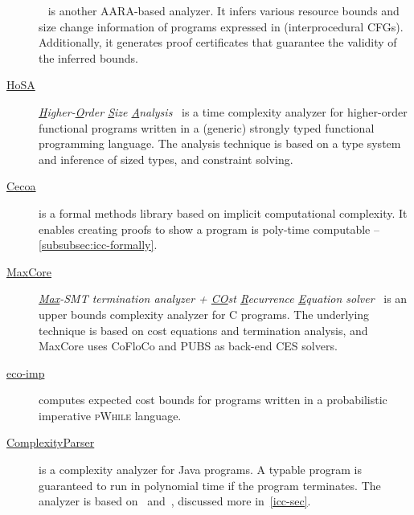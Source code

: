 \begin{description}
\item[\href{https://github.com/academic-archive/cav17-pastis}{}]
      ~\cite{carbonneaux2017,carbonneaux2018}
      is another AARA-based analyzer. It infers various resource bounds and size
      change information of programs expressed in  (interprocedural
      CFGs). Additionally, it generates proof certificates that guarantee the
      validity of the inferred bounds.

\item[\href{http://cl-informatik.uibk.ac.at/users/zini/software/hosa/}{HoSA}]
      \emph{\underline{H}igher-\underline{O}rder \underline{S}ize
      \underline{A}nalysis}~\cite{avanzini2017}
      is a time complexity analyzer for higher-order functional programs written
      in a (generic) strongly typed functional programming language. The
      analysis technique is based on a type system and inference of sized types,
      and constraint solving.

\item[\href{https://github.com/davidnowak/cecoa}
     {Cecoa}]\cite{feree2018}
     is a formal methods library based on implicit computational complexity.
     It enables creating proofs to show a program is poly-time
     computable -- \autoref{subsubsec:icc-formally}.

\item[\href{https://costa.fdi.ucm.es/maxcore/}{MaxCore}]%
      \emph{\underline{Max}-SMT termination analyzer + \underline{CO}st
      \underline{R}ecurrence \underline{E}quation
      solver}~\cite{albert2019} is an upper bounds complexity
      analyzer for C programs. The underlying technique is based on
      cost equations and termination analysis, and MaxCore uses CoFloCo and PUBS
      as back-end CES solvers.

\item[\href{https://www-sop.inria.fr/members/Martin.Avanzini/software/eco-imp/}
      {eco-imp}]\cite{avanzini2020}
      computes expected cost bounds for programs written in a probabilistic
      imperative \textsc{pWhile} language.

\item[\href{https://gitlab.inria.fr/complexityparser/complexityparser}
      {ComplexityParser}]\cite{hainry2021}
      is a complexity analyzer for Java programs. A typable program
      is guaranteed to run in polynomial time if the program terminates. The
      analyzer is based on~\cite{hainry2015} and~\cite{hainry2018}, discussed
      more in~\autoref{icc-sec}.


\end{description}
